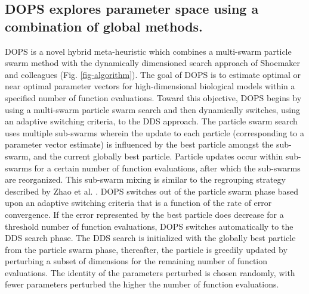 \documentclass{bmcart}
\begin{document}
\subsection*{DOPS explores parameter space using a combination of global methods.}
DOPS is a novel hybrid meta-heuristic which combines a multi-swarm particle swarm method with the dynamically dimensioned search approach of Shoemaker and colleagues (Fig. \ref{fig-algorithm}).
The goal of DOPS is to estimate optimal or near optimal parameter vectors for high-dimensional biological models within a specified number of function evaluations.
Toward this objective, DOPS begins by using a multi-swarm particle swarm search and then dynamically switches, using an adaptive switching criteria, to the DDS approach.
The particle swarm search uses multiple sub-swarms wherein the update to each particle (corresponding to a parameter vector estimate) is influenced by the best particle amongst the sub-swarm, and the current globally best particle.
Particle updates occur within sub-swarms for a certain number of function evaluations, after which the sub-swarms are reorganized.
This sub-swarm mixing is similar to the regrouping strategy described by Zhao et al. \cite{zhao2008dynamic}. DOPS switches out of the particle swarm phase based upon an adaptive switching criteria that is a function of the rate of error convergence.
If the error represented by the best particle does decrease for a threshold number of function evaluations, DOPS switches automatically to the DDS search phase.
The DDS search is initialized with the globally best particle from the particle swarm phase, thereafter, the particle is greedily updated by perturbing a subset of dimensions for the remaining number of function evaluations.
The identity of the parameters perturbed is chosen randomly, with fewer parameters perturbed the higher the number of function evaluations.

\end{document}
